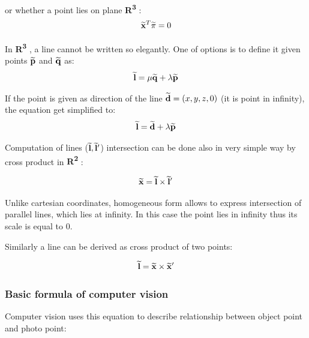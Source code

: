 \documentclass[a4paper,12pt]{article}
\newcommand{\ehvect}[1]{
{\bf \widetilde{#1}}
}
\newcommand{\escal}[1]{
{\it #1}
}
\newcommand{\eucl}[1]{
{\bf R\textsuperscript{#1}}
}
\begin{document}
or whether a point lies on plane \eucl{3}:
\begin{equation}
\ehvect{x}^{T} \ehvect{\pi} = 0
\end{equation}


In \eucl{3}, a line cannot be written so elegantly.
One of options is to define it given points $\ehvect{p}$ and $\ehvect{q}$ as:
\begin{equation}
 \ehvect{l} = \escal{\mu}\ehvect{q} + \escal{\lambda}\ehvect{p}
\end{equation}

If the point is given as direction of the line $\ehvect{d} = (x, y, z, 0)$ (it is point in infinity), the equation get simplified to:
\begin{equation}
\label{eq:hline}
\ehvect{l} = \ehvect{d} + \escal{\lambda}\ehvect{p}
\end{equation}

Computation of lines ($\ehvect{l}, \ehvect{l}'$) intersection  can be done also in very simple way by cross product in \eucl{2}:

\begin{equation}
\ehvect{x} = \ehvect{l} \times \ehvect{l}' \label{eq:def_hline_pts}
\end{equation}

Unlike cartesian coordinates, homogeneous form allows to express intersection of parallel lines, which lies at infinity. 
In this case the point lies in infinity thus its scale is equal to 0.

Similarly a line can be derived as cross product of two points:

\begin{equation}
\ehvect{l} = \ehvect{x} \times \ehvect{x}'
\end{equation}


\subsubsection{Basic formula of computer vision}

Computer vision uses this equation to describe relationship between
object point and photo point:
\end{document}
